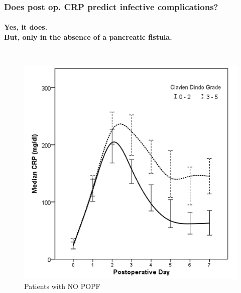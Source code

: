 \documentclass[10pt]{beamer}
\begin{document}
\begin{frame}
\end{frame}

\begin{frame}
	\frametitle{Does post op. CRP predict infective complications?}
	\framesubtitle{Yes, it does. \\ But, only in the absence of a pancreatic fistula. }
	
	\begin{columns}
		\begin{figure}
			\includegraphics[width=\textwidth]{../Figures/crp_comp_infective_leak0}
			\\ Patients with NO POPF
		\end{figure}
		

\end{columns}
\end{frame}
\end{document}
